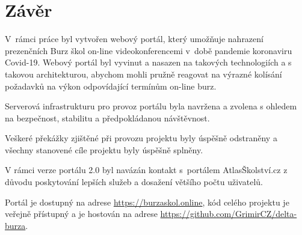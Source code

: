 \chapter*{Závěr}

V~rámci práce byl vytvořen webový portál, který umožňuje nahrazení prezenčních Burz škol on-line 
videokonferencemi v~době pandemie koronaviru Covid-19.
Webový portál byl vyvinut a nasazen na takových technologiích a s takovou architekturou, 
abychom mohli pružně reagovat na výrazné kolísání požadavků na výkon odpovídající termínům on-line burz.

Serverová infrastrukturu pro provoz portálu byla navržena a zvolena s ohledem na bezpečnost, stabilitu 
a předpokládanou návštěvnost. 

Veškeré překážky zjištěné při provozu projektu \bso{} byly úspěšně odstraněny a všechny stanovené cíle 
projektu byly úspěšně splněny.

V rámci verze portálu 2.0 byl navázán kontakt s~portálem AtlasŠkolství.cz z důvodu poskytování lepších 
služeb a dosažení většího počtu uživatelů. 

Portál je dostupný na adrese \href{https://burzaskol.online}{https://burzaskol.online},
kód celého projektu je veřejně přístupný a je hostován na adrese \href{https://github.com/GrimirCZ/delta-burza}{https://github.com/GrimirCZ/delta-burza}.


%
\pagebreak
